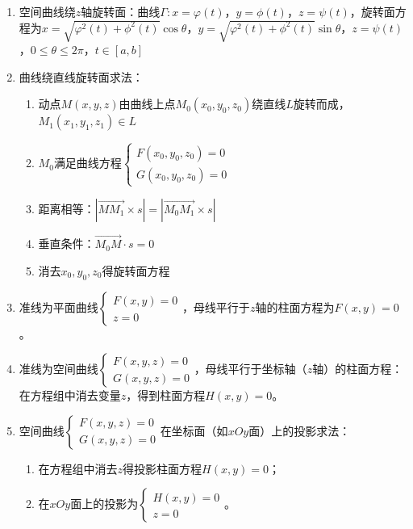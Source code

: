 \documentclass[UTF8]{ctexart}
\theoremstyle{remark}
\begin{document}
\begin{enumerate}
\item 空间曲线绕\(z\)轴旋转面：曲线\(\Gamma: x = \varphi(t)\)，\(y = \phi(t)\)，\(z = \psi(t)\)，旋转面方程为\(x = \sqrt{\varphi^2(t) + \phi^2(t)}\cos\theta\)，\(y = \sqrt{\varphi^2(t) + \phi^2(t)}\sin\theta\)，\(z = \psi(t)\)，\(0 \leq \theta \leq 2\pi\)，\(t \in [a, b]\)

\item 曲线绕直线旋转面求法：
\begin{enumerate}
	\item 动点\(M(x, y, z)\)由曲线上点\(M_0(x_0, y_0, z_0)\)绕直线\(L\)旋转而成，\(M_1(x_1, y_1, z_1) \in L\)
	\item \(M_0\)满足曲线方程\(\begin{cases} F(x_0, y_0, z_0) = 0 \\ G(x_0, y_0, z_0) = 0 \end{cases}\)
	\item 距离相等：\(|\overrightarrow{MM_1} \times s| = |\overrightarrow{M_0M_1} \times s|\)
	\item 垂直条件：\(\overrightarrow{M_0M} \cdot s = 0\)
	\item 消去\(x_0, y_0, z_0\)得旋转面方程
\end{enumerate}


\item 准线为平面曲线$\begin{cases}F(x, y)=0\\z=0\end{cases}$，母线平行于$z$轴的柱面方程为$F(x, y)=0$。

\item 准线为空间曲线$\begin{cases}F(x, y, z)=0\\G(x, y, z)=0\end{cases}$，母线平行于坐标轴（$z$轴）的柱面方程：在方程组中消去变量$z$，得到柱面方程$H(x, y)=0$。

\item 空间曲线$\begin{cases}F(x, y, z)=0\\G(x, y, z)=0\end{cases}$在坐标面（如$xOy$面）上的投影求法：
\begin{enumerate}
	\item 在方程组中消去$z$得投影柱面方程$H(x, y)=0$；
	\item 在$xOy$面上的投影为$\begin{cases}H(x, y)=0\\z=0\end{cases}$。
\end{enumerate}


\end{enumerate}
\end{document}
